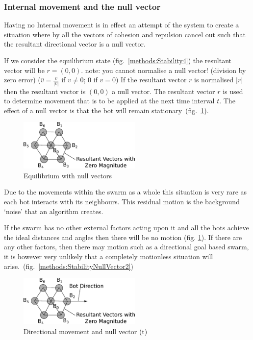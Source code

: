 \documentclass[10pt,journal,letterpaper,twoside]{IEEEtran}
\newcommand{\Stability}{Internal movement}
\newcommand{\Fig}{fig.}
\begin{document}
\subsubsection{\Stability{} and the null vector}\label{Section:StabilityNullVector}

Having no \Stability{} is in effect an attempt of the system to create
a situation where by all the vectors of cohesion and repulsion cancel
out such that the resultant directional vector is a null vector.

If we consider the equilibrium state (\Fig{}~\ref{methods:Stability4})
the resultant vector will be $r = (0,0)$. note: you cannot normalise a
null vector! (division by zero error) ($\hat{v} = \frac{v}{|v|}$ if
$v\neq0$; $0$ if $v=0$) If the resultant vector $r$ is normalised
$|r|$ then the resultant vector is $(0,0)$ a null vector. The
resultant vector $r$ is used to determine movement that is to be
applied at the next time interval $t$. The effect of a null vector is
that the bot will remain
stationary~(\Fig{}~\ref{methods:StabilityNullVector}).

\begin{figure}[H]
\begin{center}
\includegraphics[width=6cm]{figures/StabilityNullVector}
\end{center}
\caption{Equilibrium with null vectors} \label{methods:StabilityNullVector}
\end{figure}

Due to the movements within the swarm as a whole this situation is
very rare as each bot interacts with its neighbours. This residual
motion is the background `noise' that an algorithm creates.

If the swarm has no other external factors acting upon it and all the
bots achieve the ideal distances and angles then there will be no
motion (\Fig{} \ref{methods:StabilityNullVector}). If there are any
other factors, then there may motion such as a directional goal based
swarm, it is however very unlikely that a completely motionless
situation will arise.~(\Fig{}~\ref{methods:StabilityNullVector2})

\begin{figure}[H]
\begin{center}
\includegraphics[width=6cm]{figures/StabilityNullVector3}
\end{center}
\caption{Directional movement and null vector (t)} \label{methods:StabilityNullVector3}
\end{figure}
\end{document}
